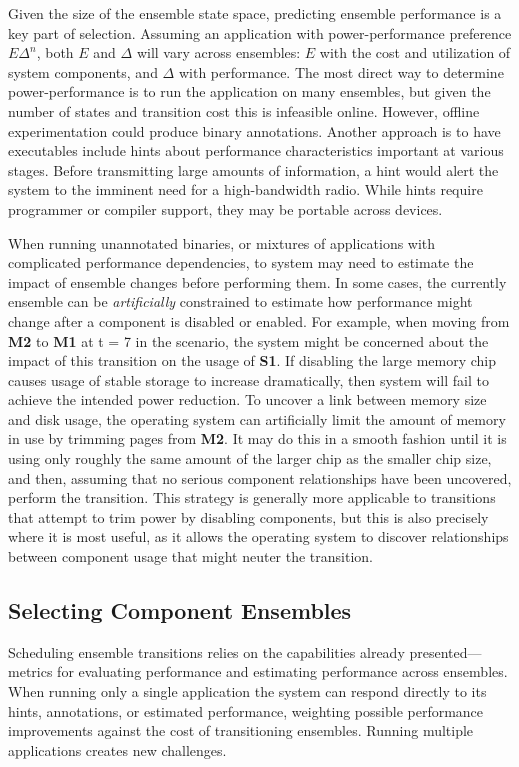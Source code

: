 Given the size of the ensemble state space, predicting ensemble performance
is a key part of selection. Assuming an application with power-performance
preference $E\Delta^n$, both $E$ and $\Delta$ will vary across ensembles: $E$
with the cost and utilization of system components, and $\Delta$ with
performance. The most direct way to determine power-performance is to run the
application on many ensembles, but given the number of states and transition
cost this is infeasible online. However, offline experimentation could
produce binary annotations. Another approach is to have executables include
hints about performance characteristics important at various stages. Before
transmitting large amounts of information, a hint would alert the system to
the imminent need for a high-bandwidth radio. While hints require programmer
or compiler support, they may be portable across devices.

When running unannotated binaries, or mixtures of applications with
complicated performance dependencies, to system may need to estimate the
impact of ensemble changes before performing them. In some cases, the
currently ensemble can be \textit{artificially} constrained to estimate how
performance might change after a component is disabled or enabled. For
example, when moving from \textbf{M2} to \textbf{M1} at t = 7 in the
scenario, the system might be concerned about the impact of this transition
on the usage of \textbf{S1}. If disabling the large memory chip causes usage
of stable storage to increase dramatically, then system will fail to achieve
the intended power reduction. To uncover a link between memory size and disk
usage, the operating system can artificially limit the amount of memory in
use by trimming pages from \textbf{M2}. It may do this in a smooth fashion
until it is using only roughly the same amount of the larger chip as the
smaller chip size, and then, assuming that no serious component relationships
have been uncovered, perform the transition. This strategy is generally more
applicable to transitions that attempt to trim power by disabling components,
but this is also precisely where it is most useful, as it allows the
operating system to discover relationships between component usage that might
neuter the transition.

\subsection{Selecting Component Ensembles}
\label{subsec-select}

Scheduling ensemble transitions relies on the capabilities already
presented---metrics for evaluating performance and estimating performance
across ensembles. When running only a single application the system can
respond directly to its hints, annotations, or estimated performance,
weighting possible performance improvements against the cost of transitioning
ensembles. Running multiple applications creates new challenges.

